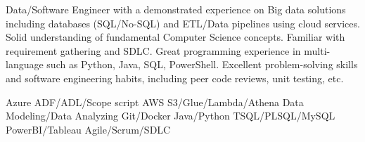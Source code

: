 \documentclass[a4paper]{ReadableCV}
\begin{document}






\showHeader{}



Data/Software Engineer with a demonstrated experience on Big data solutions including databases (SQL/No-SQL) and ETL/Data pipelines using cloud services. Solid understanding of fundamental Computer Science concepts. Familiar with requirement gathering and SDLC. Great programming experience in multi-language such as Python, Java, SQL, PowerShell. Excellent problem-solving skills and software engineering habits, including peer code reviews, unit testing, etc.


{Azure ADF/ADL/Scope script}
{AWS S3/Glue/Lambda/Athena}
{Data Modeling/Data Analyzing}
{Git/Docker}
{Java/Python}
{TSQL/PLSQL/MySQL}
{PowerBI/Tableau}
{Agile/Scrum/SDLC}



\end{document}
